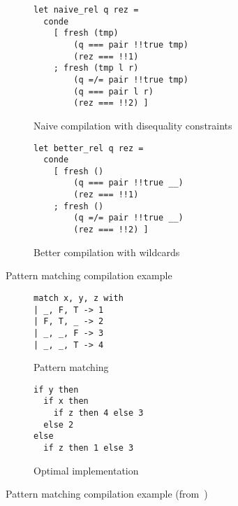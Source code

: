 \begin{figure}[ht]
\begin{subfigure}[t]{1.0\linewidth}
\centering
\begin{lstlisting}
let naive_rel q rez =
  conde
    [ fresh (tmp) 
        (q === pair !!true tmp) 
        (rez === !!1)
    ; fresh (tmp l r) 
        (q =/= pair !!true tmp) 
        (q === pair l r)
        (rez === !!2) ]
\end{lstlisting}
\caption{Naive compilation with disequality constraints}
\end{subfigure}
\begin{subfigure}[t]{1.0\linewidth}
\centering
\begin{lstlisting}
let better_rel q rez =
  conde
    [ fresh () 
        (q === pair !!true __) 
        (rez === !!1)
    ; fresh () 
        (q =/= pair !!true __) 
        (rez === !!2) ]
\end{lstlisting}
\caption{Better compilation with wildcards}
\end{subfigure}
\caption{Pattern matching compilation example } 
\label{fig:match-compilation-small}
\end{figure}

\begin{figure}[ht]
\begin{subfigure}[t]{0.4\linewidth}
\centering
\begin{lstlisting}
match x, y, z with
| _, F, T -> 1
| F, T, _ -> 2
| _, _, F -> 3
| _, _, T -> 4
\end{lstlisting}
\caption{Pattern matching}
\label{fig:matching-example1}
\end{subfigure}
\hspace{0.2cm}
\begin{subfigure}[t]{0.33\linewidth}
\centering
\begin{lstlisting}
if y then
  if x then
    if z then 4 else 3
  else 2
else
  if z then 1 else 3
\end{lstlisting}
\caption{Optimal implementation}
\label{fig:matching-example3}
\end{subfigure}
\caption{Pattern matching compilation example (from~\cite{maranget2001})} 
\label{fig:match-example}
\end{figure}
